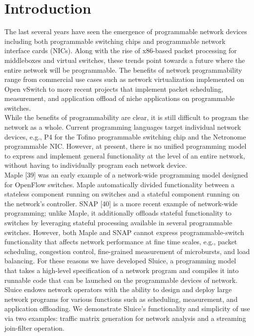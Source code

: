\section{Introduction}
The last several years have seen the emergence of programmable network devices including both programmable switching chips and programmable network interface cards (NICs). Along with the rise of x86-based packet processing for middleboxes and virtual switches, these trends point towards a future where the entire network will be programmable. The benefits of network programmability range from commercial use cases such as network virtualization implemented on Open vSwitch to more recent projects that implement packet scheduling, measurement, and application offload of niche applications on programmable switches. \\
\indent While the benefits of programmability are clear, it is still difficult to program the network as a whole. Current programming languages target individual network devices, e.g., P4 for the Tofino programmable switching chip and the Netronome programmable NIC. However, at present, there is no unified programming model to express and implement general functionality at the level of an entire network, without having to individually program each network device.\\
\indent Maple [39] was an early example of a network-wide programming model designed for OpenFlow switches. Maple automatically divided functionality between a stateless component running on switches and a stateful component running on the network's controller. SNAP [40] is a more recent example of network-wide programming; unlike Maple, it additionally offloads stateful functionality to switches by leveraging stateful processing available in several programmable switches. However, both Maple and SNAP cannot express programmable-switch functionality that affects network performance at fine time scales, e.g., packet scheduling, congestion control, fine-grained measurement of microbursts, and load balancing. For these reasons we have developed Sluice, a programming model that takes a high-level specification of a network program and compiles it into runnable code that can be launched on the programmable devices of network. Sluice endows network operators with the ability to design and deploy large network programs for various functions such as scheduling, measurement, and application offloading. We demonstrate Sluice's functionality and simplicity of use via two examples: traffic matrix generation for network analysis and a streaming join-filter operation.

